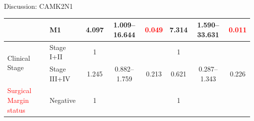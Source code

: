 \documentclass[paperwidth=78cm,paperheight=110cm,portrait]{baposter}
\begin{document}
\begin{poster}
\begin{posterbox}[name=problems,column=2,below=install]{Discussion: CAMK2N1}
\begin{center}
{\begin{tabular}{|l|l|c|c|c|c|c|c|}
\cline{2-8}
                                        & M1                                                                                  & 4.097                                                                          & 1.009--16.644                                                                  & \textcolor{red}{0.049}                                                        & 7.314                                                                          & 1.590--33.631                                                                  & \textcolor{red}{0.011}                                                         \\ 
\hline
\multirow{2}{*}{Clinical Stage}         & {\cellcolor[rgb]{0.62,0.812,0.878}}Stage I+II                                       & {\cellcolor[rgb]{0.62,0.812,0.878}}1                                           & {\cellcolor[rgb]{0.62,0.812,0.878}}                                           & {\cellcolor[rgb]{0.62,0.812,0.878}}                                           & {\cellcolor[rgb]{0.62,0.812,0.878}}1                                           & {\cellcolor[rgb]{0.62,0.812,0.878}}                                           & {\cellcolor[rgb]{0.62,0.812,0.878}}                                            \\ 
\cline{2-8}
                                        & Stage III+IV                                                                        & 1.245                                                                          & 0.882--1.759                                                                   & 0.213                                                                         & 0.621                                                                          & 0.287--1.343                                                                   & 0.226                                                                          \\ 
\hline
\multirow{2}{*}{\textcolor{red}{Surgical Margin status}} & {\cellcolor[rgb]{0.62,0.812,0.878}}Negative                                         & {\cellcolor[rgb]{0.62,0.812,0.878}}1                                           & {\cellcolor[rgb]{0.62,0.812,0.878}}                                           & {\cellcolor[rgb]{0.62,0.812,0.878}}                                           & {\cellcolor[rgb]{0.62,0.812,0.878}}1                                           & {\cellcolor[rgb]{0.62,0.812,0.878}}                                           & {\cellcolor[rgb]{0.62,0.812,0.878}}                                            \\ 

\end{tabular}}
\end{center}
\end{posterbox}
\end{poster}
\end{document}
